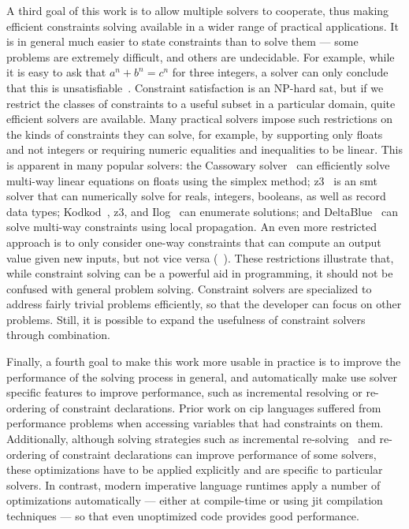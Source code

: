 A third goal of this work is to allow multiple solvers to cooperate, thus making
efficient constraints solving available in a wider range of practical
applications. It is in general much easier to state constraints than to solve
them --- some problems are extremely difficult, and others are undecidable.  For
example, while it is easy to ask that $a^n + b^n = c^n$ for three integers, a
solver can only conclude that this is
unsatisfiable~\cite{wiles-fermat1995}. Constraint satisfaction is an NP-hard
\gls{sat}, but if we restrict the classes of constraints to a useful subset in a
particular domain, quite efficient solvers are available.  Many practical
solvers impose such restrictions on the kinds of constraints they can solve, for
example, by supporting only floats and not integers or requiring numeric
equalities and inequalities to be linear.  This is apparent in many popular
solvers: the Cassowary solver~\cite{badros2001cassowary} can efficiently solve
multi-way linear equations on floats using the simplex method;
\gls{z3}~\cite{de2008z3} is an \gls{smt} solver that can numerically solve for
reals, integers, booleans, as well as record data types;
Kodkod~\cite{torlak2007kodkod}, \gls{z3}, and
Ilog~\cite{ilogmanual,puget1994c++} can enumerate solutions; and
DeltaBlue~\cite{freeman-benson-phoenix-1989} can solve multi-way constraints
using local propagation.  An even more restricted approach is to only consider
one-way constraints that can compute an output value given new inputs, but not
vice versa (\eg~\cite{hudson-uist-1996,myers-ieee-computer-1990}). These
restrictions illustrate that, while constraint solving can be a powerful aid in
programming, it should not be confused with general problem solving. Constraint
solvers are specialized to address fairly trivial problems efficiently, so that
the developer can focus on other problems. Still, it is possible to expand the
usefulness of constraint solvers through combination.

Finally, a fourth goal to make this work more usable in practice is to improve
the performance of the solving process in general, and automatically make use
solver specific features to improve performance, such as incremental resolving
or re-ordering of constraint declarations. Prior work on \ac{cip} languages
suffered from performance problems when accessing variables that had constraints
on them. Additionally, although solving strategies such as incremental
re-solving~\cite{freeman-benson-phoenix-1989} and re-ordering of constraint
declarations can improve performance of some solvers, these optimizations have
to be applied explicitly and are specific to particular solvers. In contrast,
modern imperative language runtimes apply a number of optimizations
automatically --- either at compile-time or using \gls{jit} compilation
techniques --- so that even unoptimized code provides good performance.

